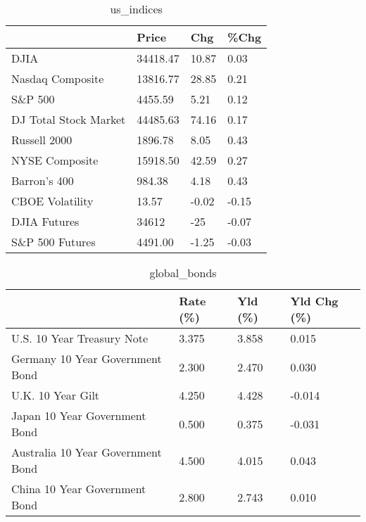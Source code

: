 \documentclass{article}%
\begin{document}
%


\begin{table}[htbp]%
\caption{us\_indices}%
\centering%
\begin{adjustbox}{width=1\textwidth}%
\begin{tabular}{llll}
\toprule
                      &    Price &   Chg &  \%Chg \\
\midrule
                 DJIA & 34418.47 & 10.87 &  0.03 \\
     Nasdaq Composite & 13816.77 & 28.85 &  0.21 \\
              S\&P 500 &  4455.59 &  5.21 &  0.12 \\
DJ Total Stock Market & 44485.63 & 74.16 &  0.17 \\
         Russell 2000 &  1896.78 &  8.05 &  0.43 \\
       NYSE Composite & 15918.50 & 42.59 &  0.27 \\
         Barron's 400 &   984.38 &  4.18 &  0.43 \\
      CBOE Volatility &    13.57 & -0.02 & -0.15 \\
         DJIA Futures &    34612 &   -25 & -0.07 \\
      S\&P 500 Futures &  4491.00 & -1.25 & -0.03 \\
\bottomrule
\end{tabular}
%
\end{adjustbox}%
\end{table}

%


\begin{table}[htbp]%
\caption{global\_bonds}%
\centering%
\begin{adjustbox}{width=1\textwidth}%
\begin{tabular}{llll}
\toprule
                                  & Rate (\%) & Yld (\%) & Yld Chg (\%) \\
\midrule
       U.S. 10 Year Treasury Note &    3.375 &   3.858 &       0.015 \\
  Germany 10 Year Government Bond &    2.300 &   2.470 &       0.030 \\
                U.K. 10 Year Gilt &    4.250 &   4.428 &      -0.014 \\
    Japan 10 Year Government Bond &    0.500 &   0.375 &      -0.031 \\
Australia 10 Year Government Bond &    4.500 &   4.015 &       0.043 \\
    China 10 Year Government Bond &    2.800 &   2.743 &       0.010 \\
\bottomrule
\end{tabular}
%
\end{adjustbox}%
\end{table}
\end{document}
